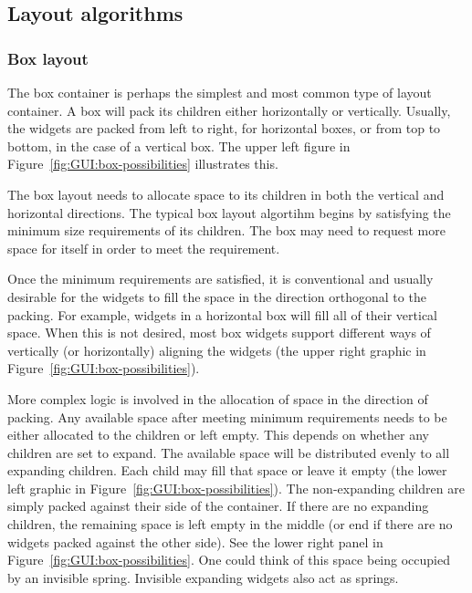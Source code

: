 \subsection{Layout algorithms}
\label{sec:GUI:layout}

\subsubsection{Box layout}
\label{sec:GUI:Box-containers}

The box container is perhaps the simplest and most common type of
layout container. A box will pack its children either horizontally or
vertically. Usually, the widgets are packed from left to right, for
horizontal boxes, or from top to bottom, in the case of a vertical
box.  The upper left figure in Figure~\ref{fig:GUI:box-possibilities}
illustrates this.

The box layout needs to allocate space to its children in both the
vertical and horizontal directions. The typical box layout algortihm
begins by satisfying the minimum size requirements of its
children. The box may need to request more space for itself in order
to meet the requirement. 

Once the minimum requirements are satisfied, it is conventional and
usually desirable for the widgets to fill the space in the direction
orthogonal to the packing. For example, widgets in a horizontal box
will fill all of their vertical space. When this is not desired, most
box widgets support different ways of vertically (or horizontally)
aligning the widgets (the upper right graphic in
Figure~\ref{fig:GUI:box-possibilities}).

More complex logic is involved in the allocation of space in the
direction of packing. Any available space after meeting minimum
requirements needs to be either allocated to the children or left
empty. This depends on whether any children are set to expand. The
available space will be distributed evenly to all expanding
children. Each child may fill that space or leave it empty (the lower
left graphic in Figure~\ref{fig:GUI:box-possibilities}). The
non-expanding children are simply packed against their
side of the container. If there are no expanding children, the
remaining space is left empty in the middle (or end if there are no
widgets packed against the other side). See the lower right
panel in Figure~\ref{fig:GUI:box-possibilities}. One could think
of this space being occupied by an invisible spring. Invisible
expanding widgets also act as springs.


